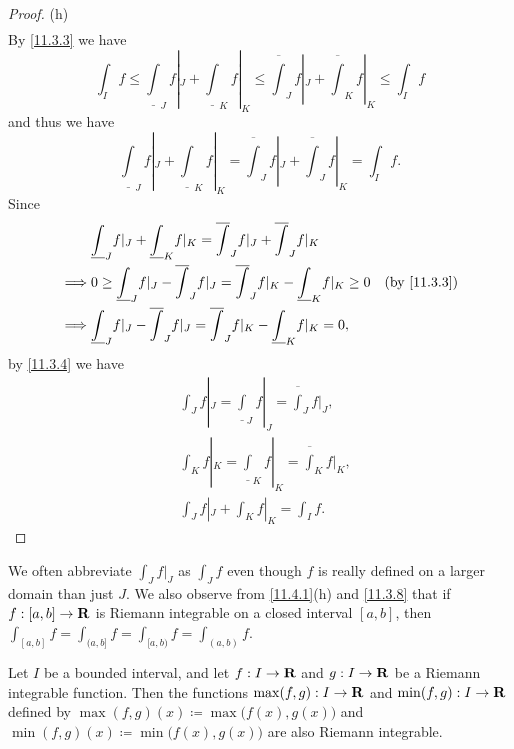 \begin{proof}{(h)}
\begin{align*}
  \end{align*}
  By \cref{11.3.3} we have
  \[
    \int_I f \leq \underline{\int}_J f|_J + \underline{\int}_K f|_K \leq \overline{\int}_J f|_J + \overline{\int}_K f|_K \leq \int_I f
  \]
  and thus we have
  \[
    \underline{\int}_J f|_J + \underline{\int}_K f|_K = \overline{\int}_J f|_J + \overline{\int}_J f|_K = \int_I f.
  \]
  Since
  \begin{align*}
             & \underline{\int}_J f|_J + \underline{\int}_K f|_K = \overline{\int}_J f|_J + \overline{\int}_J f|_K                                           \\
    \implies & 0 \geq \underline{\int}_J f|_J - \overline{\int}_J f|_J = \overline{\int}_J f|_K - \underline{\int}_K f|_K \geq 0 & \text{(by \cref{11.3.3})} \\
    \implies & \underline{\int}_J f|_J - \overline{\int}_J f|_J = \overline{\int}_J f|_K - \underline{\int}_K f|_K = 0,
  \end{align*}
  by \cref{11.3.4} we have
  \begin{align*}
     & \int_J f|_J = \underline{\int}_J f|_J = \overline{\int}_J f|_J, \\
     & \int_K f|_K = \underline{\int}_K f|_K = \overline{\int}_K f|_K, \\
     & \int_J f|_J + \int_K f|_K = \int_I f.
  \end{align*}
\end{proof}

\begin{remark}\label{11.4.2}
  We often abbreviate \(\int_J f|_J\) as \(\int_J f\) even though \(f\) is really defined on a larger domain than just \(J\).
  We also observe from \cref{11.4.1}(h) and \cref{11.3.8} that if \(f : [a, b] \to \mathbf{R}\) is Riemann integrable on a closed interval \([a, b]\), then \(\int_{[a, b]} f = \int_{(a, b]} f = \int_{[a, b)} f = \int_{(a, b)} f\).
\end{remark}

\begin{theorem}\label{11.4.3}
  Let \(I\) be a bounded interval, and let \(f : I \to \mathbf{R}\) and \(g : I \to \mathbf{R}\) be a Riemann integrable function.
  Then the functions \(\max(f, g) : I \to \mathbf{R}\) and \(\min(f, g) : I \to \mathbf{R}\) defined by \(\max(f, g)(x) \coloneqq \max\big(f(x), g(x)\big)\) and \(\min(f, g)(x) \coloneqq \min\big(f(x), g(x)\big)\) are also Riemann integrable.
\end{theorem}

